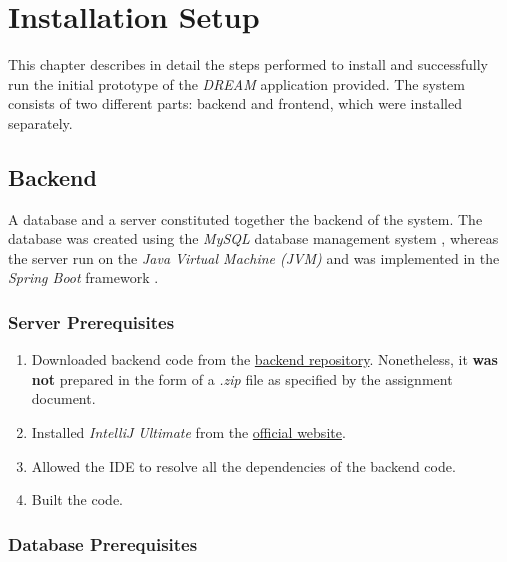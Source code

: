 \chapter{Installation Setup} \label{ch:installation_setup}

This chapter describes in detail the steps performed to install and successfully run the initial prototype of the \textit{DREAM} application provided. The system consists of two different parts: backend and frontend, which were installed separately.

\section{Backend}

A database and a server constituted together the backend of the system. The database was created using the \textit{MySQL} database management system \cite{mysql}, whereas the server run on the \textit{Java Virtual Machine (JVM)} and was implemented in the \textit{Spring Boot} framework \cite{spring_boot}.

\subsection{Server Prerequisites}

\begin{enumerate}
    \item Downloaded backend code from the \href{https://github.com/marticaffa/CaffagniniFaouziButtiglione/tree/main/Code/back-end}{backend repository}. Nonetheless, it \textbf{was not} prepared in the form of a \textit{.zip} file as specified by the assignment document.
    \item Installed \textit{IntelliJ Ultimate} from the \href{https://www.jetbrains.com/idea/download/}{official website}.
    \item Allowed the IDE to resolve all the dependencies of the backend code.
    \item Built the code.
\end{enumerate}

\subsection{Database Prerequisites}

